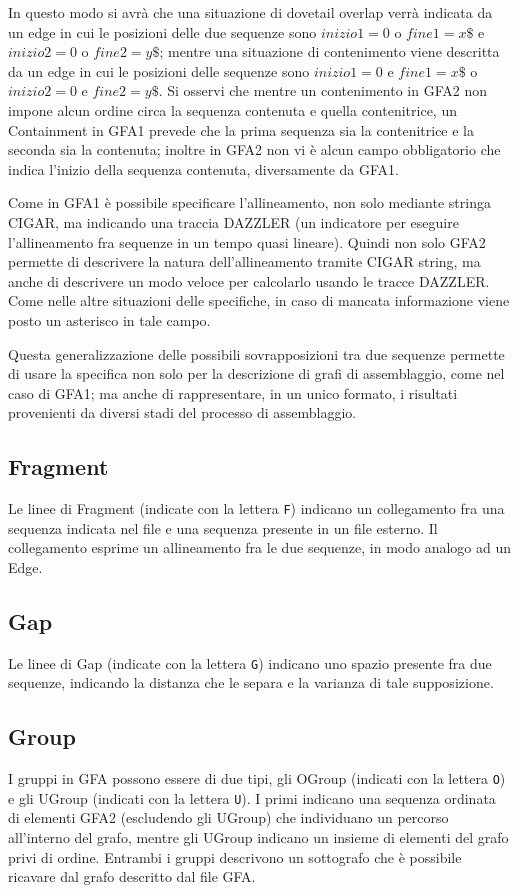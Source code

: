 In questo modo si avrà che una situazione di dovetail overlap
verrà indicata da un edge in cui le posizioni delle due sequenze
sono $inizio1=0$ o $fine1 = x\$$ e $inizio2 =0$ o $fine2=y\$$;
mentre una situazione di contenimento viene descritta
da un edge in cui le posizioni delle sequenze sono $inizio1=0$ e 
$fine1=x\$$ o $inizio2=0$ e $fine2=y\$$. Si osservi che mentre
un contenimento in GFA2 non impone alcun ordine circa la sequenza
contenuta e quella contenitrice, un Containment in GFA1 prevede
che la prima sequenza sia la contenitrice e la seconda sia la contenuta;
inoltre in GFA2 non vi è alcun campo obbligatorio che indica l'inizio della
sequenza contenuta, diversamente da GFA1.

Come in GFA1 è possibile specificare l'allineamento, non solo mediante
stringa CIGAR, ma indicando una traccia DAZZLER (un indicatore
per eseguire l'allineamento fra sequenze in un tempo quasi lineare).
Quindi non solo GFA2 permette di descrivere la natura dell'allineamento tramite
CIGAR string, ma anche di descrivere un modo veloce per calcolarlo usando
le tracce DAZZLER. Come nelle altre situazioni delle specifiche, in caso
di mancata informazione viene posto un asterisco in tale campo.

Questa generalizzazione delle possibili sovrapposizioni tra due sequenze
permette di usare la specifica non solo per la descrizione di grafi di assemblaggio,
come nel caso di GFA1; ma anche di rappresentare, in un unico formato,
i risultati provenienti da diversi stadi del processo di assemblaggio.

\subsection{Fragment}
Le linee di Fragment (indicate con la lettera \texttt{F}) indicano un
collegamento fra una sequenza indicata nel file e una sequenza presente in un file esterno.
Il collegamento esprime un allineamento fra le due sequenze, in modo analogo ad
un Edge.

\subsection{Gap}
Le linee di Gap (indicate con la lettera \texttt{G}) indicano uno spazio
presente fra due sequenze, indicando la distanza che le separa e la
varianza di tale supposizione.

\subsection{Group}
I gruppi in GFA possono essere di due tipi, gli OGroup (indicati con la lettera \texttt{O})
e gli UGroup (indicati con la lettera \texttt{U}). I primi indicano una sequenza ordinata di elementi
GFA2 (escludendo gli UGroup) che individuano un percorso all'interno del grafo, mentre
gli UGroup indicano un insieme di elementi del grafo privi di ordine. Entrambi
i gruppi descrivono un sottografo che è possibile ricavare
dal grafo descritto dal file GFA.

